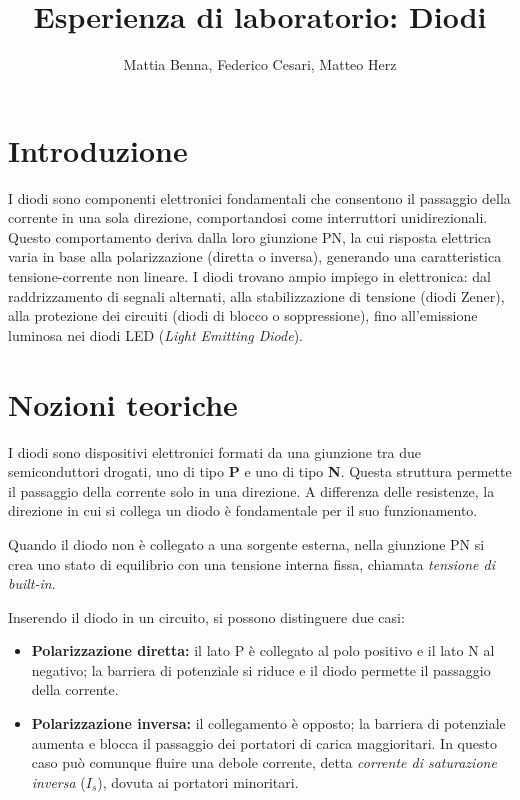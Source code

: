 \documentclass[9pt,a4paper,twocolumn,twoside]{tau-class/tau}
\title{Esperienza di laboratorio: Diodi}
\author[b,c,3]{Mattia Benna, Federico Cesari, Matteo Herz}
\begin{document}
		
    \maketitle 
    \thispagestyle{firststyle} 
    \tauabstract
    
\section{Introduzione}
I diodi sono componenti elettronici fondamentali che consentono il passaggio della corrente in una sola direzione, comportandosi come interruttori unidirezionali. Questo comportamento deriva dalla loro giunzione PN, la cui risposta elettrica varia in base alla polarizzazione (diretta o inversa), generando una caratteristica tensione-corrente non lineare.
I diodi trovano ampio impiego in elettronica: dal raddrizzamento di segnali alternati, alla stabilizzazione di tensione (diodi Zener), alla protezione dei circuiti (diodi di blocco o soppressione), fino all'emissione luminosa nei diodi LED (\textit{Light Emitting Diode}).

\section{Nozioni teoriche}\label{sec:2}
I diodi sono dispositivi elettronici formati da una giunzione tra due semiconduttori drogati, uno di tipo \textbf{P} e uno di tipo \textbf{N}. Questa struttura permette il passaggio della corrente solo in una direzione. A differenza delle resistenze, la direzione in cui si collega un diodo è fondamentale per il suo funzionamento.

Quando il diodo non è collegato a una sorgente esterna, nella giunzione PN si crea uno stato di equilibrio con una tensione interna fissa, chiamata \textit{tensione di built-in}.

Inserendo il diodo in un circuito, si possono distinguere due casi:

\begin{itemize}
    \item \textbf{Polarizzazione diretta:} il lato P è collegato al polo positivo e il lato N al negativo; la barriera di potenziale si riduce e il diodo permette il passaggio della corrente.
    
    \item \textbf{Polarizzazione inversa:} il collegamento è opposto; la barriera di potenziale aumenta e blocca il passaggio dei portatori di carica maggioritari. In questo caso può comunque fluire una debole corrente, detta \textit{corrente di saturazione inversa} (\( I_s \)), dovuta ai portatori minoritari.
\end{itemize}
\end{document}
